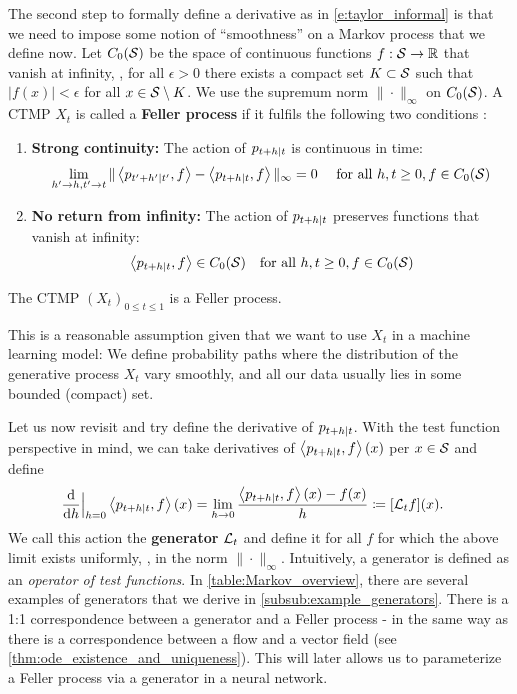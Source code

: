\documentclass{fairmeta}
\newcommand{\highlight}[1]{{\color{metablue} \textbf{#1}}}
\renewcommand{\eqref}[1]{\labelcref{#1}}
\numberwithin{equation}{section}
\begin{document}
The second step to formally define a derivative as in \cref{e:taylor_informal} is that we need to impose some notion of ``smoothness'' on a Markov process that we define now. Let $C_0({\mathcal{S}})$ be the space of continuous functions $f:{\mathcal{S}}\to\mathbb{R}$ that vanish at infinity, \ie, for all $\epsilon>0$ there exists a compact set $K\subset {\mathcal{S}}$ such that $|f(x)|<\epsilon$ for all $x\in{\mathcal{S}}\setminus K$. We use the supremum norm $\|\cdot\|_{\infty}$ on $C_0({\mathcal{S}})$. A CTMP $X_t$ is called a \highlight{Feller process} if it fulfils the following two conditions \citep{feller1955second,ruschendorf2016comparison}:
\begin{enumerate}
    \item \highlight{Strong continuity: }The action of $p_{t+h|t}$ is continuous in time:
\begin{align*}
\lim\limits_{h'\to h,t'\to t}\|\left \langle p_{t'+h'|t'}, f\right \rangle-\left \langle p_{t+h|t}, f\right \rangle\|_{\infty} =0\quad \text{ for all }h,t\geq 0, f\in C_0({\mathcal{S}})
\end{align*}
\item \highlight{No return from infinity: }The action of $p_{t+h|t}$ preserves functions that vanish at infinity:
\begin{align*}
\left \langle p_{t+h|t}, f\right \rangle\in C_0({\mathcal{S}})\quad\text{for all }h,t\geq 0, f\in C_0({\mathcal{S}})
\end{align*}
\end{enumerate}
\begin{myframe}
\begin{assumption}\label{as:feller}
The CTMP $(X_t)_{0\leq t\leq 1}$ is a Feller process.
\end{assumption}    
\end{myframe}
This is a reasonable assumption given that we want to use $X_t$ in a machine learning model: We define probability paths where the distribution of the generative process $X_t$ vary smoothly, and all our data usually lies in some bounded (compact) set. 

Let us now revisit \eqref{e:taylor_informal} and try define the derivative of $p_{t+h|t}$. With the test function perspective in mind, we can take derivatives of $\left \langle p_{t+h|t}, f\right \rangle(x)$ per $x\in {\mathcal{S}}$ and define
\begin{align}\label{e:generator}
    \frac{\mathrm{d}}{\mathrm{d} h}\Big\vert_{h=0}\left \langle p_{t+h|t}, f\right \rangle(x)
    &= \lim_{h\rightarrow 0} \frac{\left \langle p_{t+h|t}, f\right \rangle(x) - f(x)}{h} \coloneqq [{\mathcal{L}}_t f](x).
\end{align}
We call this action the \highlight{generator} ${\mathcal{L}}_t$ and define it for all $f$ for which the above limit exists uniformly, \ie, in the norm $\|\cdot\|_{\infty}$. Intuitively, a generator is defined as an \emph{operator of test functions}. In \cref{table:Markov_overview}, there are several examples of generators that we derive in \cref{subsub:example_generators}. There is a 1:1 correspondence between a generator and a Feller process 
\citep{rogers2000diffusions, ethier2009markov, pazy2012semigroups} - in the same way as there is a correspondence between a flow and a vector field (see \cref{thm:ode_existence_and_uniqueness}). This will later allows us to parameterize a Feller process via a generator in a neural network.
\end{document}
